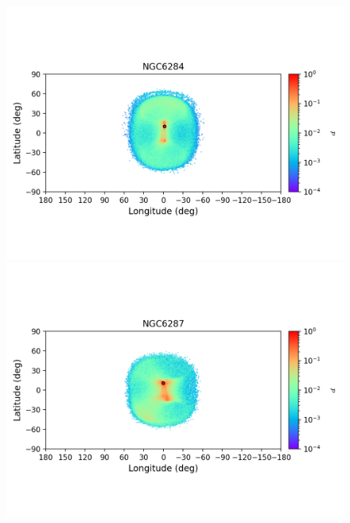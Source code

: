 \begin{figure}
\begin{center}
                \includegraphics[clip=true, trim = 0mm 20mm 0mm 10mm, width=1\columnwidth]{images/error_plots_NGC6284.png}
                \includegraphics[clip=true, trim = 0mm 20mm 0mm 10mm, width=1\columnwidth]{images/error_plots_NGC6287.png}
                

\end{center}
\end{figure}
